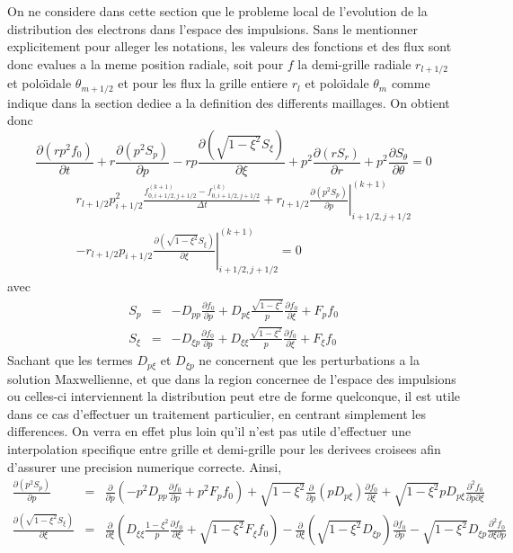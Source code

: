 On ne considere dans cette section que le probleme local de l'evolution
de la distribution des electrons dans l'espace des impulsions. Sans
le mentionner explicitement pour alleger les notations, les valeurs
des fonctions et des flux sont donc evalues a la meme position radiale,
soit pour $f$ la demi-grille radiale $r_{l+1/2}$ et polo\"{\i}dale
$\theta_{m+1/2}$ et pour les flux la grille entiere $r_{l}$ et polo\"{\i}dale
$\theta_{m}$ comme indique dans la section dediee a la definition
des differents maillages. On obtient donc \[
\frac{\partial\left(rp^{2}f_{0}\right)}{\partial t}+r\frac{\partial\left(p^{2}S_{p}\right)}{\partial p}-rp\frac{\partial\left(\sqrt{1-\xi^{2}}S_{\xi}\right)}{\partial\xi}+p^{2}\frac{\partial\left(rS_{r}\right)}{\partial r}+p^{2}\frac{\partial S_{\theta}}{\partial\theta}=0\]
\begin{eqnarray*}
 &  & r_{l+1/2}p_{i+1/2}^{2}\frac{f_{0,i+1/2,j+1/2}^{(k+1)}-f_{0,i+1/2,j+1/2}^{(k)}}{\Delta t}+r_{l+1/2}\left.\frac{\partial\left(p^{2}S_{p}\right)}{\partial p}\right|_{i+1/2,j+1/2}^{(k+1)}\\
 &  & -r_{l+1/2}p_{i+1/2}\left.\frac{\partial\left(\sqrt{1-\xi^{2}}S_{\xi}\right)}{\partial\xi}\right|_{i+1/2,j+1/2}^{(k+1)}=0\end{eqnarray*}
 avec \begin{eqnarray*}
S_{p} & = & -D_{pp}\frac{\partial f_{0}}{\partial p}+D_{p\xi}\frac{\sqrt{1-\xi^{2}}}{p}\frac{\partial f_{0}}{\partial\xi}+F_{p}f_{0}\\
S_{\xi} & = & -D_{\xi p}\frac{\partial f_{0}}{\partial p}+D_{\xi\xi}\frac{\sqrt{1-\xi^{2}}}{p}\frac{\partial f_{0}}{\partial\xi}+F_{\xi}f_{0}\end{eqnarray*}
 Sachant que les termes $D_{p\xi}$ et $D_{\xi p}$ ne concernent
que les perturbations a la solution Maxwellienne, et que dans la region
concernee de l'espace des impulsions ou celles-ci interviennent la
distribution peut etre de forme quelconque, il est utile dans ce cas
d'effectuer un traitement particulier, en centrant simplement les
differences. On verra en effet plus loin qu'il n'est pas utile d'effectuer
une interpolation specifique entre grille et demi-grille pour les
derivees croisees afin d'assurer une precision numerique correcte.
Ainsi, \begin{eqnarray*}
\frac{\partial\left(p^{2}S_{p}\right)}{\partial p} & = & \frac{\partial}{\partial p}\left(-p^{2}D_{pp}\frac{\partial f_{0}}{\partial p}+p^{2}F_{p}f_{0}\right)+\sqrt{1-\xi^{2}}\frac{\partial}{\partial p}\left(pD_{p\xi}\right)\frac{\partial f_{0}}{\partial\xi}+\sqrt{1-\xi^{2}}pD_{p\xi}\frac{\partial^{2}f_{0}}{\partial p\partial\xi}\\
\frac{\partial\left(\sqrt{1-\xi^{2}}S_{\xi}\right)}{\partial\xi} & = & \frac{\partial}{\partial\xi}\left(D_{\xi\xi}\frac{1-\xi^{2}}{p}\frac{\partial f_{0}}{\partial\xi}+\sqrt{1-\xi^{2}}F_{\xi}f_{0}\right)-\frac{\partial}{\partial\xi}\left(\sqrt{1-\xi^{2}}D_{\xi p}\right)\frac{\partial f_{0}}{\partial p}-\sqrt{1-\xi^{2}}D_{\xi p}\frac{\partial^{2}f_{0}}{\partial\xi\partial p}\end{eqnarray*}
